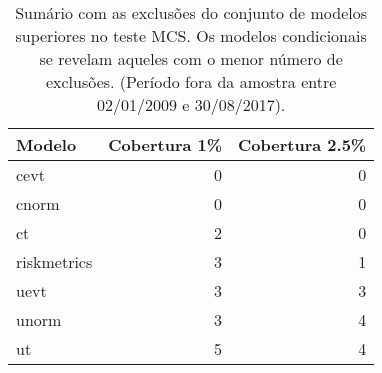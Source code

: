 \begin{table}[H]
\centering
\caption{Sumário com as exclusões do conjunto de modelos superiores no teste MCS.
             Os modelos condicionais se revelam aqueles com o menor número de exclusões. 
             (Período fora da amostra entre 02/01/2009 e 30/08/2017).} 
\label{tab:mcs_suma}
\begin{tabular}{lrr}
  \hline
Modelo & Cobertura 1\% & Cobertura 2.5\% \\ 
  \hline
cevt &   0 &   0 \\ 
  cnorm &   0 &   0 \\ 
  ct &   2 &   0 \\ 
  riskmetrics &   3 &   1 \\ 
  uevt &   3 &   3 \\ 
  unorm &   3 &   4 \\ 
  ut &   5 &   4 \\ 
   \hline
\end{tabular}
\end{table}
